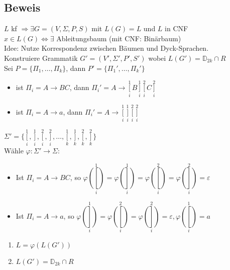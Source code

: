     \subsection{Beweis}
        $L$ kf $\Rightarrow\exists G=(V,\Sigma,P,S)$ mit $L(G)=L$ und $L$ in CNF\\
        $x\in L(G)\Leftrightarrow\exists$ Ableitungsbaum (mit CNF: Binärbaum)\\
        Idee: Nutze Korrespondenz zwischen Bäumen und Dyck-Sprachen.\\\vspace{2mm}
        Konstruiere Grammatik $G'=(V',\Sigma',P',S')$ wobei $L(G')=\mathds{D}_{2k}\cap R$\\
        Sei $P=\{\Pi_1,\dots,\Pi_k\}$, dann $P'=\{\Pi_1',\dots,\Pi_k'\}$
        \begin{itemize}
            \item ist $\Pi_i=A\rightarrow BC$, dann $\Pi_i'=A\rightarrow\mathop{[}\limits_i^1B\mathop{]}\limits_i^1\mathop{[}\limits_i^2C\mathop{]}\limits_i^2$
            \item ist $\Pi_i=A\rightarrow a$, dann $\Pi_i'=A\rightarrow\mathop{[}\limits_i^1\mathop{]}\limits_i^1\mathop{[}\limits_i^2\mathop{]}\limits_i^2$
        \end{itemize}
        $\Sigma'=\{\mathop{[}\limits_i^1,\mathop{]}\limits_i^1,\mathop{[}\limits_i^2,\mathop{]}\limits_i^2,\dots,\mathop{[}\limits_k^1,\mathop{]}\limits_k^1,\mathop{[}\limits_k^2,\mathop{]}\limits_k^2\}$\\
        Wähle $\varphi:\Sigma'\rightarrow\Sigma$:
        \begin{itemize}
            \item Ist $\Pi_i=A\rightarrow BC$, so $\varphi(\mathop{[}\limits_i^1)=\varphi(\mathop{]}\limits_i^1)=\varphi(\mathop{[}\limits_i^2)=\varphi(\mathop{]}\limits_i^2)=\varepsilon$
            \item Ist $\Pi_i=A\rightarrow a$, so $\varphi(\mathop{]}\limits_i^1)=\varphi(\mathop{[}\limits_i^2)=\varphi(\mathop{]}\limits_i^2)=\varepsilon,\varphi(\mathop{[}\limits_i^1)=a$
        \end{itemize}
        \begin{enumerate}[1)]
            \item $L=\varphi(L(G'))$
            \item $L(G')=\mathds{D}_{2k}\cap R$
        \end{enumerate}
